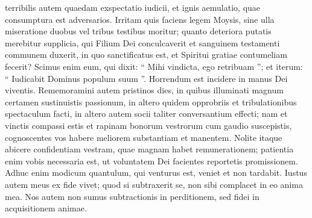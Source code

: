 \begin{biblechapter}
\begin{biblechapter}
\begin{biblechapter}
\begin{biblechapter}
\begin{biblechapter}
\begin{biblechapter}
\begin{biblechapter}
\begin{biblechapter}
\begin{biblechapter}
\begin{biblechapter}
\verse terribilis autem quaedam exspectatio iudicii, et ignis aemulatio, quae consumptura est adversarios. 
 \verse Irritam quis faciens legem Moysis, sine ulla miseratione duobus vel tribus testibus moritur; 
\verse quanto deteriora putatis merebitur supplicia, qui Filium Dei conculcaverit et sanguinem testamenti communem duxerit, in quo sanctificatus est, et Spiritui gratiae contumeliam fecerit? 
 \verse Scimus enim eum, qui dixit: “ Mihi vindicta, ego retribuam ”; et iterum: “ Iudicabit Dominus populum suum ”. 
\verse Horrendum est incidere in manus Dei viventis.
 \verse Rememoramini autem pristinos dies, in quibus illuminati magnum certamen sustinuistis passionum, 
\verse in altero quidem opprobriis et tribulationibus spectaculum facti, in altero autem socii taliter conversantium effecti; 
\verse nam et vinctis compassi estis et rapinam bonorum vestrorum cum gaudio suscepistis, cognoscentes vos habere meliorem substantiam et manentem. 
\verse Nolite itaque abicere confidentiam vestram, quae magnam habet remunerationem; 
\verse patientia enim vobis necessaria est, ut voluntatem Dei facientes reportetis promissionem.
 \verse Adhuc enim modicum quantulum,
 qui venturus est, veniet et non tardabit.
 \verse Iustus autem meus ex fide vivet;
 quod si subtraxerit se,
 non sibi complacet in eo anima mea.
 \verse Nos autem non sumus subtractionis in perditionem, sed fidei in acquisitionem animae.
 

\end{biblechapter}
\end{biblechapter}
\end{biblechapter}
\end{biblechapter}
\end{biblechapter}
\end{biblechapter}
\end{biblechapter}
\end{biblechapter}
\end{biblechapter}
\end{biblechapter}
